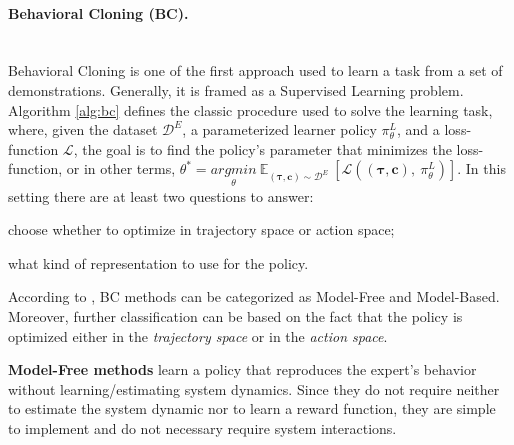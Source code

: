 \paragraph{Behavioral Cloning (BC).} \mbox{} \\ 
Behavioral Cloning is one of the first approach used to learn a task from a set of demonstrations. Generally, it is framed as a Supervised Learning problem. Algorithm \ref{alg:bc} defines the classic procedure used to solve the learning task, where, given the dataset $\mathcal{D}^{E}$, a parameterized learner policy $\pi^{L}_{\theta}$, and a loss-function $\mathcal{L}$, the goal is to find the policy's parameter that minimizes the loss-function, or in other terms, $\theta^{*} = \underset{\theta}{argmin} \ \mathbb{E}_{(\boldsymbol{\tau}, \mathbf{c}) \sim \mathcal{D}^{E}} \ [\mathcal{L}((\boldsymbol{\tau}, \mathbf{c}), \ \pi^{L}_{\theta})]$.
In this setting there are at least two questions to answer: 
\begin{enumerate*}[label=\textbf{(\arabic*)}]
    \item choose whether to optimize in trajectory space or action space;
    \item what kind of representation to use for the policy.
\end{enumerate*}
\newline According to \cite{osa2018algorithmic}, BC methods can be categorized as Model-Free and Model-Based. Moreover, further classification can be based on the fact that the policy is optimized either in the \textit{trajectory space} or in the \textit{action space}. 
 

\textbf{Model-Free methods} learn a policy that reproduces the expert's behavior without learning/estimating system dynamics. Since they do not require neither to estimate the system dynamic nor to learn a reward function, they are simple to implement and do not necessary require system  interactions. 

